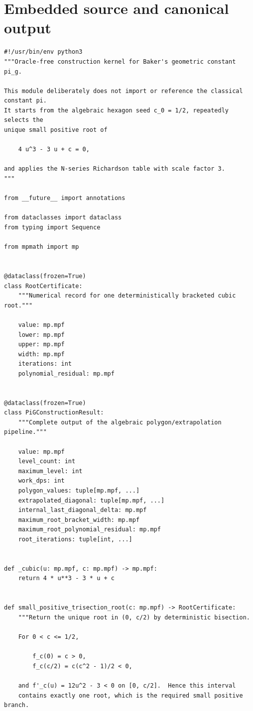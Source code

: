 \documentclass[11pt]{article}
\begin{document}
\section{Embedded source and canonical output}
\begin{lstlisting}[style=pythonstyle,caption={Production lane: \texttt{pi\_g\_construction.py}}]
#!/usr/bin/env python3
"""Oracle-free construction kernel for Baker's geometric constant pi_g.

This module deliberately does not import or reference the classical constant pi.
It starts from the algebraic hexagon seed c_0 = 1/2, repeatedly selects the
unique small positive root of

    4 u^3 - 3 u + c = 0,

and applies the N-series Richardson table with scale factor 3.
"""

from __future__ import annotations

from dataclasses import dataclass
from typing import Sequence

from mpmath import mp


@dataclass(frozen=True)
class RootCertificate:
    """Numerical record for one deterministically bracketed cubic root."""

    value: mp.mpf
    lower: mp.mpf
    upper: mp.mpf
    width: mp.mpf
    iterations: int
    polynomial_residual: mp.mpf


@dataclass(frozen=True)
class PiGConstructionResult:
    """Complete output of the algebraic polygon/extrapolation pipeline."""

    value: mp.mpf
    level_count: int
    maximum_level: int
    work_dps: int
    polygon_values: tuple[mp.mpf, ...]
    extrapolated_diagonal: tuple[mp.mpf, ...]
    internal_last_diagonal_delta: mp.mpf
    maximum_root_bracket_width: mp.mpf
    maximum_root_polynomial_residual: mp.mpf
    root_iterations: tuple[int, ...]


def _cubic(u: mp.mpf, c: mp.mpf) -> mp.mpf:
    return 4 * u**3 - 3 * u + c


def small_positive_trisection_root(c: mp.mpf) -> RootCertificate:
    """Return the unique root in (0, c/2) by deterministic bisection.

    For 0 < c <= 1/2,

        f_c(0) = c > 0,
        f_c(c/2) = c(c^2 - 1)/2 < 0,

    and f'_c(u) = 12u^2 - 3 < 0 on [0, c/2].  Hence this interval
    contains exactly one root, which is the required small positive branch.


\end{lstlisting}
\end{document}
